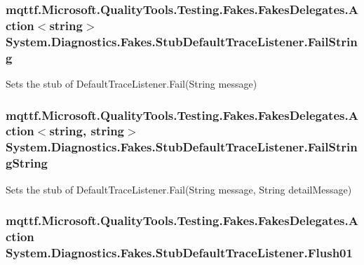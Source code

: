\hypertarget{class_system_1_1_diagnostics_1_1_fakes_1_1_stub_default_trace_listener_adf46726a603d09eff04125a0a950d622}{
\subsubsection[{Fail\-String}]{\setlength{\rightskip}{0pt plus 5cm}mqttf.\-Microsoft.\-Quality\-Tools.\-Testing.\-Fakes.\-Fakes\-Delegates.\-Action$<$string$>$ System.\-Diagnostics.\-Fakes.\-Stub\-Default\-Trace\-Listener.\-Fail\-String}}\label{class_system_1_1_diagnostics_1_1_fakes_1_1_stub_default_trace_listener_adf46726a603d09eff04125a0a950d622}


Sets the stub of Default\-Trace\-Listener.\-Fail(\-String message)

\hypertarget{class_system_1_1_diagnostics_1_1_fakes_1_1_stub_default_trace_listener_ab8b66fe93d7f020820e2f8530dee3dee}{
\subsubsection[{Fail\-String\-String}]{\setlength{\rightskip}{0pt plus 5cm}mqttf.\-Microsoft.\-Quality\-Tools.\-Testing.\-Fakes.\-Fakes\-Delegates.\-Action$<$string, string$>$ System.\-Diagnostics.\-Fakes.\-Stub\-Default\-Trace\-Listener.\-Fail\-String\-String}}\label{class_system_1_1_diagnostics_1_1_fakes_1_1_stub_default_trace_listener_ab8b66fe93d7f020820e2f8530dee3dee}


Sets the stub of Default\-Trace\-Listener.\-Fail(\-String message, String detail\-Message)

\hypertarget{class_system_1_1_diagnostics_1_1_fakes_1_1_stub_default_trace_listener_a87d53eb2b30049b967fb396eb2ac484d}{
\subsubsection[{Flush01}]{\setlength{\rightskip}{0pt plus 5cm}mqttf.\-Microsoft.\-Quality\-Tools.\-Testing.\-Fakes.\-Fakes\-Delegates.\-Action System.\-Diagnostics.\-Fakes.\-Stub\-Default\-Trace\-Listener.\-Flush01}}\label{class_system_1_1_diagnostics_1_1_fakes_1_1_stub_default_trace_listener_a87d53eb2b30049b967fb396eb2ac484d}


